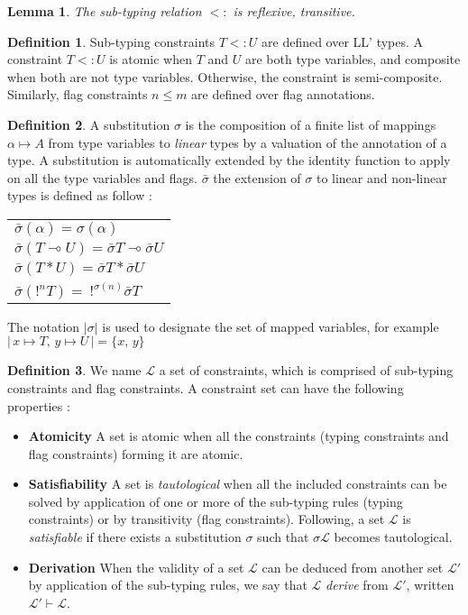 \documentclass[10pt]{article}
\theoremstyle{plain}
\theoremstyle{definition}
\newtheorem{defn}{Definition}[subsection] %
\newtheorem{lemma}{Lemma}[section]
\begin{document}
\begin{lemma} \it The sub-typing relation $<:$ is reflexive, transitive.
\end{lemma}

\begin{defn} Sub-typing constraints $T <: U$ are defined over LL' types. A constraint $T <: U$ is atomic
  when $T$ and $U$ are both type variables, and composite when both are not type variables. Otherwise, the constraint is
  semi-composite. \\
  Similarly, flag constraints $n \le m$ are defined over flag annotations.
\end{defn}

\begin{defn} A substitution $\sigma$ is the composition of a finite list of mappings $\alpha \mapsto A$ from type variables to
	\textit{linear} types 	by a valuation of the annotation of a type. A substitution is automatically extended by the identity function
	to apply on all the type variables and flags.
	$\bar{\sigma}$ the extension of $\sigma$ to linear and non-linear types is defined as follow :
 		\begin{center}
 		\begin{tabular}{l}
 			$\bar{\sigma}(\alpha) = \sigma(\alpha)$ \\
 			$\bar{\sigma}(T \multimap U) = \bar{\sigma}T \multimap \bar{\sigma}U$ \\
 			$\bar{\sigma}(T * U) = \bar{\sigma}T * \bar{\sigma}U$ \\
 			$\bar{\sigma}(!^n T) = ~ !^{\sigma(n)} \bar{\sigma}T$
 		\end{tabular}
 		\end{center}
 	The notation $|\sigma|$ is used to designate the set of mapped variables, for example
 	$ | \,x \mapsto T, \, y \mapsto U\,| = \{ x, \,y \} $
\end{defn}

\begin{defn} We name $\mathcal{L}$ a set of constraints, which is comprised of sub-typing constraints
  and flag constraints. A constraint set can have the following properties :
  \begin{itemize}
  	\item[]{\bf Atomicity} A set is atomic when all the constraints (typing constraints and flag constraints) forming it are atomic.
  	\item[]{\bf Satisfiability} A set is \textit{tautological} when all the included constraints can be solved by application of one or
  		more of the sub-typing rules (typing constraints) or by transitivity (flag constraints).
  		Following, a set $\mathcal{L}$ is \textit{satisfiable} if there exists a substitution $\sigma$ such that $\sigma \mathcal{L}$
	 		becomes tautological.
	 	\item[]{\bf Derivation} When the validity of a set $\mathcal{L}$ can be deduced from another set $\mathcal{L'}$ by application of
		  the sub-typing rules, we say that $\mathcal{L}$ \textit{derive} from $\mathcal{L'}$, written $\mathcal{L'} \vdash \mathcal{L}$.
  \end{itemize}
\end{defn}
\end{document}

